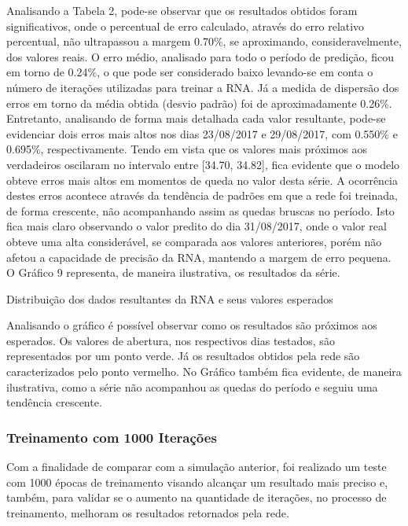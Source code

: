 Analisando a Tabela 2, pode-se observar que os resultados obtidos foram significativos, onde o percentual de erro calculado, através do erro relativo percentual, não ultrapassou a margem 0.70\%, se aproximando, consideravelmente, dos valores reais. O erro médio, analisado para todo o período de predição, ficou em torno de 0.24\%, o que pode ser considerado baixo levando-se em conta o número de iterações utilizadas para treinar a RNA. Já a medida de dispersão dos erros em torno da média obtida (desvio padrão) foi de aproximadamente 0.26\%. Entretanto, analisando de forma mais detalhada cada valor resultante, pode-se evidenciar dois erros mais altos nos dias 23/08/2017 e 29/08/2017, com 0.550\% e 0.695\%, respectivamente. Tendo em vista que os valores mais próximos aos verdadeiros oscilaram no intervalo entre [34.70, 34.82], fica evidente que o modelo obteve erros mais altos em momentos de queda no valor desta série. A ocorrência destes erros acontece através da tendência de padrões em que a rede foi treinada, de forma crescente, não acompanhando assim as quedas bruscas no período. Isto fica mais claro observando o valor predito do dia 31/08/2017, onde o valor real obteve uma alta considerável, se comparada aos valores anteriores, porém não afetou a capacidade de precisão da RNA, mantendo a margem de erro pequena. O Gráfico 9 representa, de maneira ilustrativa, os resultados da série.
\begin{grafico}[h]
	\centering
	\caption{Distribuição dos dados resultantes da RNA e seus valores esperados}
	\label{lingua}
\end{grafico}

Analisando o gráfico é possível observar como os resultados são próximos aos esperados. Os valores de abertura, nos respectivos dias testados, são representados por um ponto verde. Já os resultados obtidos pela rede são caracterizados pelo ponto vermelho. No Gráfico também fica evidente, de maneira ilustrativa, como a série não acompanhou as quedas do período e seguiu uma tendência crescente. 

\subsubsection{Treinamento com 1000 Iterações}	
Com a finalidade de comparar com a simulação anterior, foi realizado um teste com 1000 épocas de treinamento visando alcançar um resultado mais preciso e, também, para validar se o aumento na quantidade de iterações, no processo de treinamento, melhoram os resultados retornados pela rede.

